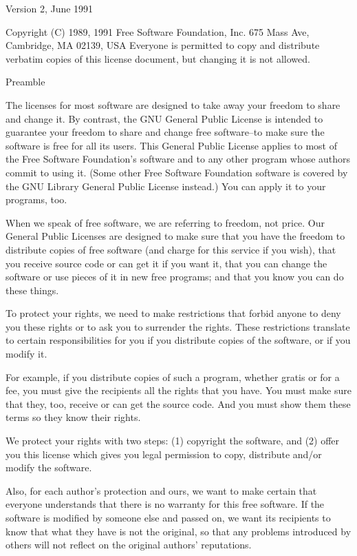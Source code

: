 		       Version 2, June 1991

Copyright (C) 1989, 1991 Free Software Foundation, Inc.
675 Mass Ave, Cambridge, MA 02139, USA
Everyone is permitted to copy and distribute verbatim copies
of this license document, but changing it is not allowed.


			    Preamble

  The licenses for most software are designed to take away your
freedom to share and change it.  By contrast, the GNU General Public
License is intended to guarantee your freedom to share and change free
software--to make sure the software is free for all its users.  This
General Public License applies to most of the Free Software
Foundation's software and to any other program whose authors commit to
using it.  (Some other Free Software Foundation software is covered by
the GNU Library General Public License instead.)  You can apply it to
your programs, too.

  When we speak of free software, we are referring to freedom, not
price.  Our General Public Licenses are designed to make sure that you
have the freedom to distribute copies of free software (and charge for
this service if you wish), that you receive source code or can get it
if you want it, that you can change the software or use pieces of it
in new free programs; and that you know you can do these things.

  To protect your rights, we need to make restrictions that forbid
anyone to deny you these rights or to ask you to surrender the rights.
These restrictions translate to certain responsibilities for you if you
distribute copies of the software, or if you modify it.

  For example, if you distribute copies of such a program, whether
gratis or for a fee, you must give the recipients all the rights that
you have.  You must make sure that they, too, receive or can get the
source code.  And you must show them these terms so they know their
rights.

  We protect your rights with two steps: (1) copyright the software, and
(2) offer you this license which gives you legal permission to copy,
distribute and/or modify the software.

  Also, for each author's protection and ours, we want to make certain
that everyone understands that there is no warranty for this free
software.  If the software is modified by someone else and passed on, we
want its recipients to know that what they have is not the original, so
that any problems introduced by others will not reflect on the original
authors' reputations.

